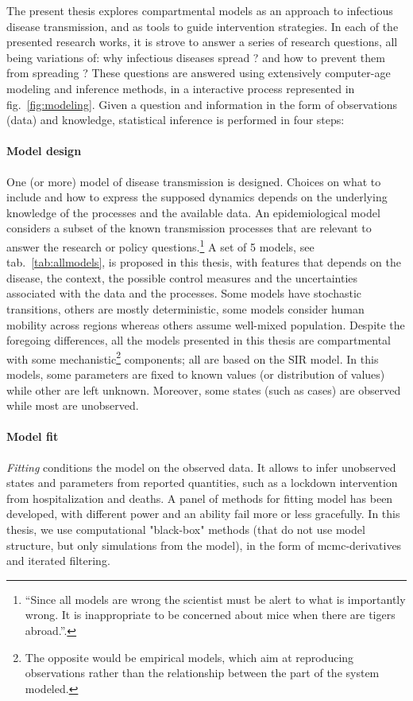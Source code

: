 The present thesis explores compartmental models as an approach to infectious disease transmission, and as tools to guide intervention strategies. In each of the presented research works, it is strove to answer a series of research questions, all being variations of: why infectious diseases spread ? and how to prevent them from spreading ? These questions are answered using extensively computer-age modeling and inference methods, in a interactive process represented in fig.~\ref{fig:modeling}. Given a question and information in the form of observations (data) and knowledge, statistical inference is performed in four steps:

\paragraph{Model design} One (or more) model of disease transmission is designed. Choices on what to include and how to express the supposed dynamics depends on the underlying knowledge of the processes and the available data. An epidemiological model considers a subset of the known transmission processes that are relevant to answer the research or policy questions.\footnote[][5\baselineskip]{“Since all models are wrong the scientist must be alert to what is importantly wrong. It is inappropriate to be concerned about mice when there are tigers abroad.”.}  A set of 5 models, see tab.~\ref{tab:allmodels}, is proposed in this thesis, with features that depends on the disease, the context, the possible control measures and the uncertainties associated with the data and the processes. Some models have stochastic transitions, others are mostly deterministic, some models consider human mobility across regions whereas others assume well-mixed population. Despite the foregoing differences, all the models presented in this thesis are compartmental with some mechanistic\footnote{The opposite would be empirical models, which aim at reproducing observations rather than the relationship between the part of the system modeled.} components; all are based on the SIR model. In this models, some parameters are fixed to known values (or distribution of values) while other are left unknown. Moreover, some states (such as cases) are observed while most are unobserved.



\paragraph{Model fit} \textit{Fitting} conditions the model on the observed data. It allows to infer unobserved states and parameters from reported quantities, such as a lockdown intervention from hospitalization and deaths. A panel of methods for fitting model has been developed, with different power and an ability fail more or less gracefully. In this thesis, we use computational "black-box" methods (that do not use model structure, but only simulations from the model), in the form of mcmc-derivatives and iterated filtering.

